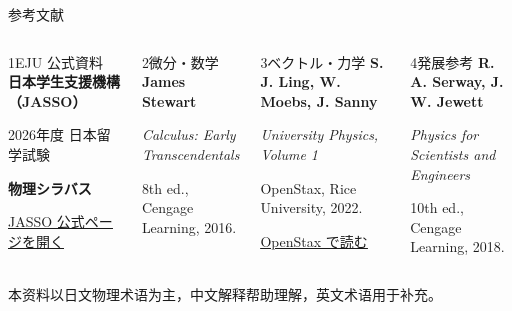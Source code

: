 \documentclass[notheorems,aspectratio=169]{beamer}
\newcommand{\jp}[1]{\textbf{\color{JapanBlue}#1}}
\begin{document}
\begin{frame}{参考文献}
  \small
  \begin{columns}[T,onlytextwidth]
    \begin{block}{1\quad EJU 公式資料}
      \textbf{日本学生支援機構（JASSO）}\par
      \vspace{0.25em}
      2026年度 日本留学試験\par
      \jp{物理シラバス}\par
      \vspace{0.35em}
      {\scriptsize
      \href{https://www.jasso.go.jp/ryugaku/eju/examinee/syllabus/science_phy.html}
      {\color{JapanBlue}\underline{JASSO 公式ページを開く}}}
    \end{block}

    \begin{alertblock}{2\quad 微分・数学}
      \textbf{James Stewart}\par
      \emph{Calculus: Early Transcendentals}\par
      8th ed., Cengage Learning, 2016.
    \end{alertblock}

    \begin{block}{3\quad ベクトル・力学}
      \textbf{S. J. Ling, W. Moebs, J. Sanny}\par
      \emph{University Physics, Volume 1}\par
      OpenStax, Rice University, 2022.\par
      \vspace{0.35em}
      {\scriptsize
      \href{https://openstax.org/details/books/university-physics-volume-1}
      {\color{JapanBlue}\underline{OpenStax で読む}}}
    \end{block}

    \begin{alertblock}{4\quad 発展参考}
      \textbf{R. A. Serway, J. W. Jewett}\par
      \emph{Physics for Scientists and Engineers}\par
      10th ed., Cengage Learning, 2018.
    \end{alertblock}
  \end{columns}

  \vfill
  \centering
  {\footnotesize 本资料以日文物理术语为主，中文解释帮助理解，英文术语用于补充。}
\end{frame}
\end{document}
